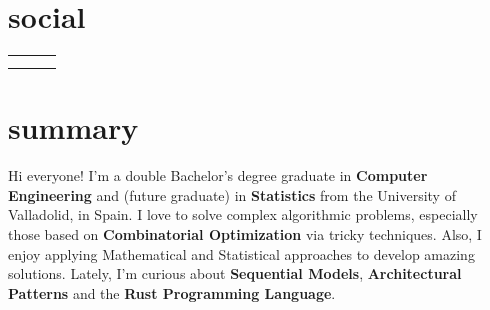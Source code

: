 \documentclass{friggeri-cv}
\newcommand{\myhref}[2]{\href[pdfnewwindow=true]{#1}{#2}}
\begin{document}


  \section{social}

    \vspace{-1.5em}
    \begin{center}
      \renewcommand{\arraystretch}{1.5}
      \begin{tabular}{ p{16em} p{17em} p{16em} }
        \myhref{https://garciparedes.me}{\faHome\quad Website: garciparedes.me}
        &
        \myhref{mailto:sergio@garciparedes.me}{\faEnvelope\quad Email: sergio@garciparedes.me}
        &
        \myhref{https://es.linkedin.com/in/garciparedes/en}{\faLinkedin\quad LinkedIn: Sergio García Prado}
        \\

        \myhref{https://github.com/garciparedes}{\faGithub\quad GitHub: @garciparedes}
        &
        \myhref{https://scholar.google.es/citations?user=X3Mb7BAAAAAJ}{\faGraduationCap\quad Scholar: Sergio García Prado}
        &
        \myhref{https://stackoverflow.com/users/3921457/garciparedes}{\faStackOverflow\quad StackOverflow: @garciparedes}
        \\
      \end{tabular}
    \end{center}




  \section{summary}

  Hi everyone! I'm a double Bachelor's degree graduate in \textbf{Computer Engineering} and (future graduate) in \textbf{Statistics} from the University of Valladolid, in Spain. I love to solve complex algorithmic problems, especially those based on \textbf{Combinatorial Optimization} via tricky techniques. Also, I enjoy applying Mathematical and Statistical approaches to develop amazing solutions. Lately, I'm curious about \textbf{Sequential Models}, \textbf{Architectural Patterns} and the \textbf{Rust Programming Language}.
\end{document}
